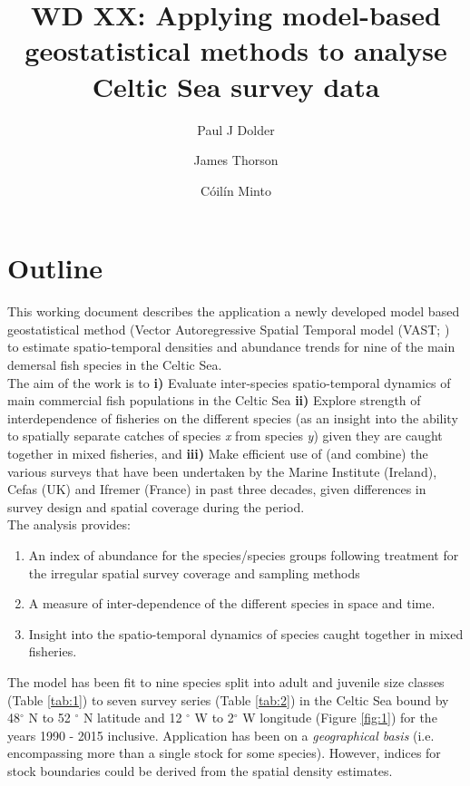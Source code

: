 \documentclass[11pt]{article}
\title{WD XX: Applying model-based geostatistical methods to analyse Celtic Sea
	survey data}
\author[1,2]{Paul J Dolder}
\author[2]{James Thorson}
\author[1]{Cóilín Minto}
\affil[1]{Galway-Mayo Institute of Technology, Ireland}
\affil[2]{Centre for Environment, Fisheries and Aquaculture Science, UK}
\affil[3]{North West Fisheries Science Center, NOAA, USA}
\begin{document}
\maketitle

\section{Outline}

This working document describes the application a newly developed model based
geostatistical method (Vector Autoregressive Spatial Temporal model (VAST;
\cite{Thorson2017}) to estimate spatio-temporal densities and abundance trends
for nine of the main demersal fish species in the Celtic Sea. \\

The aim of the work is to \textbf{i)} Evaluate inter-species spatio-temporal
dynamics of main commercial fish populations in the Celtic Sea \textbf{ii)}
Explore strength of interdependence of fisheries on the different species (as
an insight into the ability to spatially separate catches of species \textit{x}
from species \textit{y}) given they are caught together in mixed fisheries, and
\textbf{iii)} Make efficient use of (and combine) the various surveys that have
been undertaken by the Marine Institute (Ireland), Cefas (UK) and Ifremer
(France) in past three decades, given differences in survey design and spatial
coverage during the period. \\

The analysis provides:

\begin{enumerate} 
	\item An index of abundance for the species/species groups following
		treatment for the irregular spatial survey coverage and
		sampling methods 
	\item A measure of inter-dependence of the different species in space
		and time.
	\item Insight into the spatio-temporal dynamics of species caught
		together in mixed fisheries.  
\end{enumerate}

The model has been fit to nine species split into adult and juvenile size classes
(Table \ref{tab:1}) to seven survey series (Table \ref{tab:2}) in the Celtic
Sea bound by 48$^{\circ}$ N to 52 $^{\circ}$ N latitude and 12 $^{\circ}$ W to
2$^{\circ}$ W longitude (Figure \ref{fig:1}) for the years 1990 - 2015
inclusive.  Application has been on a \textit{geographical basis} (i.e.
encompassing more than a single stock for some species). However, indices for
stock boundaries could be derived from the spatial density estimates. \\
\end{document}
